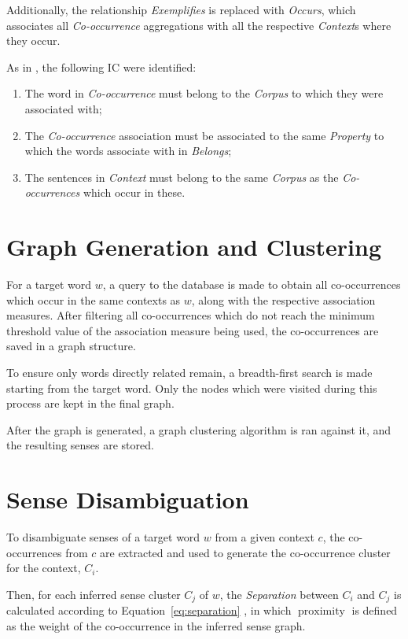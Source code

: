 Additionally, the relationship \emph{Exemplifies} is replaced with
\emph{Occurs}, which associates all \emph{Co-occurrence} aggregations with all
the respective \emph{Context}s where they occur.

As in \cite{correia2015syntax}, the following \ac{IC} were identified:

\begin{enumerate}
  \item The word in \emph{Co-occurrence} must belong to the \emph{Corpus} to
    which they were associated with;
  \item The \emph{Co-occurrence} association must be associated to the same
    \emph{Property} to which the words associate with in \emph{Belongs};
  \item The sentences in \emph{Context} must belong to the same \emph{Corpus}
    as the \emph{Co-occurrences} which occur in these.
\end{enumerate}

\section{Graph Generation and Clustering}

For a target word $w$, a query to the database is made to obtain all
co-occurrences which occur in the same contexts as $w$, along with the
respective association measures. After filtering all co-occurrences which do not
reach the minimum threshold value of the association measure being used, the
co-occurrences are saved in a graph structure.

To ensure only words directly related remain, a breadth-first search is made
starting from the target word. Only the nodes which were visited during this
process are kept in the final graph.

After the graph is generated, a graph clustering algorithm is ran against it,
and the resulting senses are stored.

\section{Sense Disambiguation}

To disambiguate senses of a target word $w$ from a given context
$c$, the co-occurrences from $c$ are extracted and used to generate
the co-occurrence cluster for the context, $C_i$.

Then, for each inferred sense cluster $C_j$ of $w$, the
\emph{Separation} between $C_i$ and $C_j$ is calculated according to
Equation~\ref{eq:separation} \cite{hope2013uos}, in which
$\operatorname{proximity}$ is defined as the weight of the co-occurrence in the
inferred sense graph.

